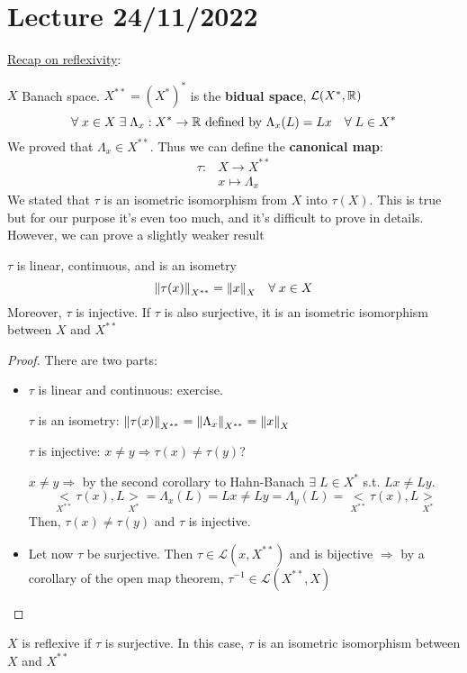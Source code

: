 \section{Lecture 24/11/2022}
\noindent\underline{Recap on reflexivity}:

\noindent\(X\) Banach space. \(X^{**} = (X^*)^*\) is the \textbf{bidual space}, \(\mathcal{L}(X^*, \mathbb{R})\)
\[
    \forall \; x \in X \; \exists \; \Lambda_x : X^* \to \mathbb{R} \mbox{ defined by } \Lambda_x(L) = Lx \quad \forall \; L \in X^*
\]
We proved that \(\Lambda_x \in X^{**}\). Thus we can define the \textbf{canonical map}:
\[
        \begin{array}{lc}
            \tau : & X \to X^{**} \\
            & x \mapsto \Lambda_x
        \end{array}
    \tag*{(Canonical Map)}
\]
We stated that \(\tau\) is an isometric isomorphism from \(X\) into \(\tau(X)\). This is true but for our purpose it's even too much, and it's difficult to prove in details. However, we can prove a slightly weaker result 
\begin{theorem}
    \(\tau\) is linear, continuous, and is an isometry
    \[
        \norm{\tau(x)}_{X^{**}} = \norm{x}_X \quad \forall \; x \in X
    \]
    Moreover, \(\tau\) is injective. If \(\tau\) is also surjective, it is an isometric isomorphism between \(X\) and \(X^{**}\)
\end{theorem}
\begin{proof}
    There are two parts:
    \begin{itemize}
        \item \(\tau\) is linear and continuous: exercise. 
        
        \noindent \(\tau\) is an isometry: \(\norm{\tau(x)}_{X^{**}} = \norm{\Lambda_x}_{X^{**}} = \norm{x}_X\)

        \noindent \(\tau\) is injective: \(x\neq y \Rightarrow \tau(x) \neq \tau(y)\)? 

        \noindent \(x \neq y \Rightarrow\) by the second corollary to Hahn-Banach \(\exists\; L \in X^*\) s.t. \(Lx \neq Ly\).
        \[
            \underset{X^{**}}{<}\tau(x), L \underset{X^*}{>} = \Lambda_x(L) = Lx \neq Ly = \Lambda_y(L) = \underset{X^{**}}{<}\tau(x), L \underset{X^*}{>}
        \]
        Then, \(\tau(x) \neq \tau(y)\) and \(\tau\) is injective.
        \item Let now \(\tau\) be surjective. Then \(\tau \in \mathcal{L}(x, X^{**})\) and is bijective \(\Rightarrow\) by a corollary of the open map theorem, \(\tau^{-1} \in \mathcal{L}(X^{**}, X)\)
    \end{itemize}
\end{proof}
\begin{definition}
    \(X\) is reflexive if \(\tau\) is surjective. In this case, \(\tau\) is an isometric isomorphism between \(X\) and \(X^{**}\)
\end{definition}

